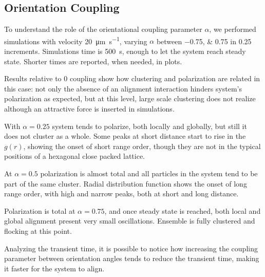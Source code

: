 \documentclass[../../master_thesis_np.tex]{subfiles}
\begin{document}
		
		\subsection{Orientation Coupling}
		To understand the role of the orientational coupling parameter $\alpha$, we performed simulations with velocity \SI{20}{\um\per\second}, varying $\alpha$ between \numlist{-0.75; 0.75} in \num{0.25} increments. 
		Simulations time is \SI{500}{\second}, enough to let the system reach steady state.
		Shorter times are reported, when needed, in plots.
		
		Results relative to \num{0} coupling show how clustering and polarization are related in this case: not only the absence of an alignment interaction hinders system's polarization as expected, but at this level, large scale clustering does not realize although an attractive force is inserted in simulations. 
		
		With $\alpha = 0.25$ system tends to polarize, both locally and globally, but still it does not cluster as a whole. 
		Some peaks at short distance start to rise in the $g(r)$, showing the onset of short range order, though they are not in the typical positions of a hexagonal close packed lattice. 
		
		At $\alpha = 0.5$ polarization is almost total and all particles in the system tend to be part of the same cluster. 
		Radial distribution function shows the onset of long range order, with high and narrow peaks, both at short and long distance.
		
		Polarization is total at $\alpha = 0.75$, and once steady state is reached, both local and global alignment present very small oscillations. 
		Ensemble is fully clustered and flocking at this point.
		
		Analyzing the transient time, it is possible to notice how increasing the coupling parameter between orientation angles tends to reduce the transient time, making it faster for the system to align.

\end{document}
